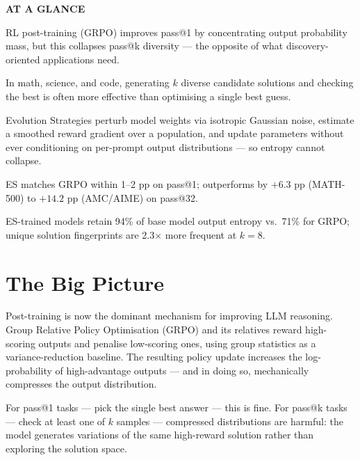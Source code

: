 \documentclass[10pt,twocolumn]{article}
\begin{document}
\begin{mdframed}[backgroundcolor=boxgray,linecolor=rulered,linewidth=1pt,
    innerleftmargin=6pt,innerrightmargin=6pt,
    innertopmargin=6pt,innerbottommargin=6pt]
\textbf{\small AT A GLANCE}\par\vspace{4pt}
\begin{description}[leftmargin=0pt,labelsep=4pt,itemsep=2pt,parsep=0pt,
    font=\small\bfseries]
  \item[Problem:] RL post-training (GRPO) improves pass@1 by concentrating
    output probability mass, but this collapses pass@k diversity — the
    opposite of what discovery-oriented applications need.
  \item[Why it matters:] In math, science, and code, generating $k$
    diverse candidate solutions and checking the best is often more
    effective than optimising a single best guess.
  \item[Method:] Evolution Strategies perturb model weights via isotropic
    Gaussian noise, estimate a smoothed reward gradient over a population,
    and update parameters without ever conditioning on per-prompt output
    distributions — so entropy cannot collapse.
  \item[Result:] ES matches GRPO within 1--2 pp on pass@1; outperforms
    by $+6.3$ pp (MATH-500) to $+14.2$ pp (AMC/AIME) on pass@32.
  \item[Evidence:] ES-trained models retain 94\% of base model output
    entropy vs.\ 71\% for GRPO; unique solution fingerprints are 2.3$\times$
    more frequent at $k{=}8$.
\end{description}
\end{mdframed}

\section{The Big Picture}

Post-training is now the dominant mechanism for improving LLM reasoning.
Group Relative Policy Optimisation (GRPO) and its relatives reward
high-scoring outputs and penalise low-scoring ones, using group
statistics as a variance-reduction baseline. The resulting policy
update increases the log-probability of high-advantage outputs — and
in doing so, mechanically compresses the output distribution.

For pass@1 tasks — pick the single best answer — this is fine.
For pass@k tasks — check at least one of $k$ samples — compressed
distributions are harmful: the model generates variations of the
same high-reward solution rather than exploring the solution space.
\end{document}

